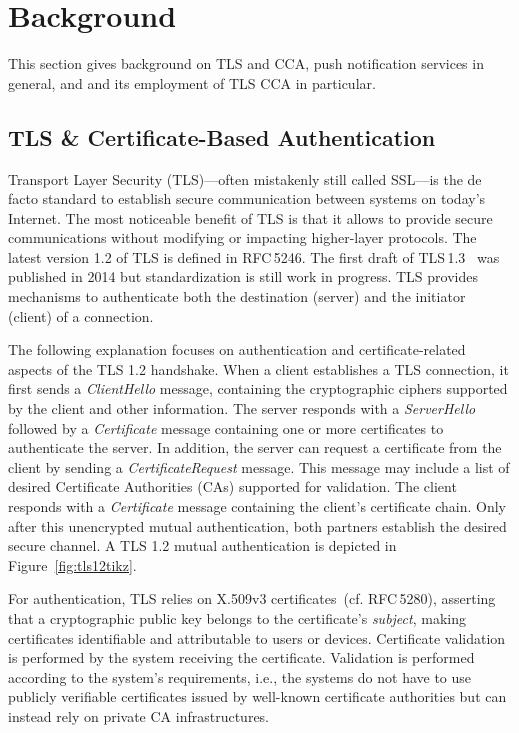 \section{Background}\label{sec:background}
This section gives background on TLS and CCA, push notification services in general, and {\apns} and its employment of TLS CCA in particular.
%
\subsection{TLS \& Certificate-Based Authentication}\label{sec:tls}
%
Transport Layer Security (TLS)---often mistakenly still called SSL---is the de facto standard to establish secure communication between systems on today's Internet.
The most noticeable benefit of TLS is that it allows to provide secure communications without modifying or impacting higher-layer protocols.
The latest version 1.2 of TLS is defined in RFC\,5246. %
The first draft of TLS\,1.3~\cite{ietf-tls-rfc5246-bis-16} was published in 2014 but standardization is still work in progress.
TLS provides mechanisms to authenticate both the destination (server) and the initiator (client) of a connection.

The following explanation focuses on authentication and certificate-related aspects of the TLS 1.2 handshake. 
When a client establishes a TLS connection, it first sends a \textit{ClientHello} message, containing the cryptographic ciphers
supported by the client and other information. 
The server responds with a \textit{ServerHello} followed by a \textit{Certificate} message containing one or more certificates to authenticate the server. 
In addition, the server can request a certificate from the client by sending a \textit{CertificateRequest} message. 
This message may include a list of desired Certificate Authorities (CAs) supported for validation. 
The client responds with a \textit{Certificate} message containing the client's certificate chain. 
Only after this unencrypted mutual authentication, both partners establish the desired secure channel. 
A TLS 1.2 mutual authentication is depicted in Figure~\ref{fig:tls12tikz}.



For authentication, TLS relies on X.509v3 certificates~(cf. RFC\,5280),
asserting that a cryptographic public key belongs to the certificate's \emph{subject},
making certificates identifiable and attributable to users or devices.
Certificate validation is performed by the system receiving the certificate. 
Validation is performed according to the system's requirements, i.e., the systems do not have to use publicly verifiable certificates issued by well-known certificate authorities but can instead rely on private CA infrastructures.

